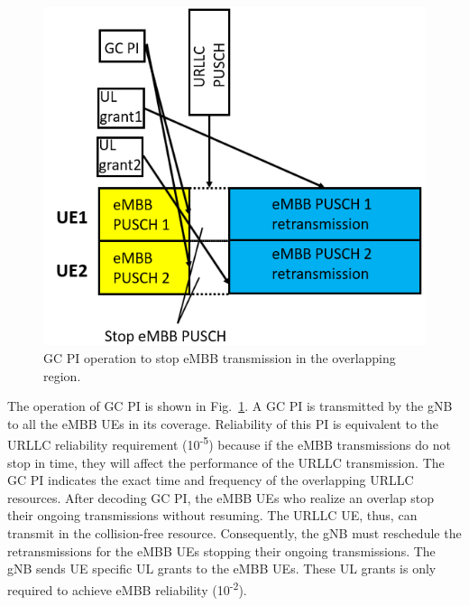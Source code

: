 \documentclass{ieeeaccess}
\begin{document}
\begin{figure}[htbp]
\centerline{\includegraphics[scale=0.38]{fig10.PNG}}
\caption{GC PI operation to stop eMBB transmission in the overlapping region.}
\label{fig10}
\vspace{-2mm}
\end{figure}

The operation of GC PI is shown in Fig.~\ref{fig10}. A GC PI is transmitted by the gNB to all the eMBB UEs in its coverage. Reliability of this PI is equivalent to the URLLC reliability requirement (10\textsuperscript{-5}) because if the eMBB transmissions do not stop in time, they will affect the performance of the URLLC transmission. The GC PI indicates the exact time and frequency of the overlapping URLLC resources. After decoding GC PI, the eMBB UEs who realize an overlap stop their ongoing transmissions without resuming. The URLLC UE, thus, can transmit in the collision-free resource. Consequently, the gNB must reschedule the retransmissions for the eMBB UEs stopping their ongoing transmissions. The gNB sends UE specific UL grants to the eMBB UEs. These UL grants is only required to achieve eMBB reliability (10\textsuperscript{-2}).
\end{document}
